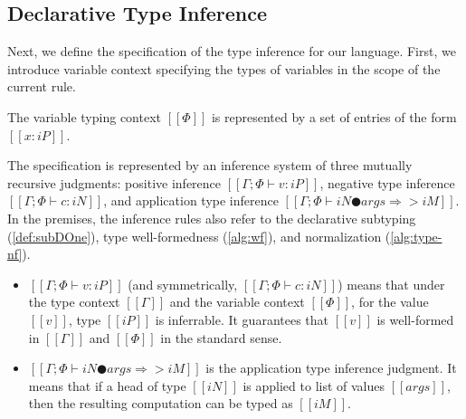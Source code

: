 \documentclass[acmsmall,natbib=false,review,anonymous]{acmart}
\begin{document}
\subsection{Declarative Type Inference}

Next, we define the specification of the type 
inference for our language. First, we introduce 
variable context specifying the types of variables 
in the scope of the current rule. 

\begin{definition}
  The variable typing context $[[Φ]]$
  is represented by a set of entries of the form
  $[[x : iP]]$. 
\end{definition}

The specification is represented by an inference system of
three mutually recursive judgments:
positive inference $[[Γ ; Φ ⊢ v : iP]]$,
negative type inference $[[Γ ; Φ ⊢ c : iN]]$, and
application type inference $[[Γ ; Φ ⊢ iN ● args ⇒> iM ]]$.
In the premises, the inference rules also refer to 
the declarative subtyping (\cref{def:subDOne}),
type well-formedness (\cref{alg:wf}), 
and normalization (\cref{alg:type-nf}).
\begin{itemize}
  \item $[[Γ ; Φ ⊢ v : iP]]$ (and symmetrically, $[[Γ ; Φ ⊢ c : iN]]$)
    means that under the type context $[[Γ]]$ and
    the variable context $[[Φ]]$, for the value $[[v]]$,
    type $[[iP]]$ is inferrable. It guarantees that 
    $[[v]]$ is well-formed in $[[Γ]]$ and $[[Φ]]$ in
    the standard sense.
  \item $[[ Γ ; Φ ⊢ iN ● args ⇒> iM ]]$ is the application type inference 
    judgment. It means that if a head of type $[[iN]]$ 
    is applied to list of values $[[args]]$, 
    then the resulting computation can be typed as $[[iM]]$.
\end{itemize}

\begin{definition}
  \label{def:declarative-typing}
  \ottdefnsDTLabeled
\end{definition}
\end{document}

